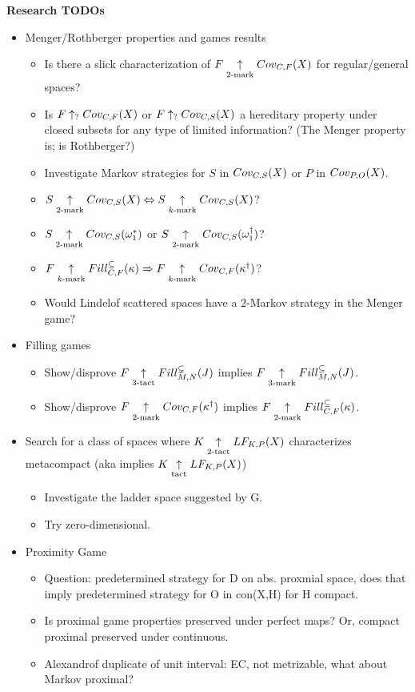 


\centerline{\bf Research TODOs}

  \begin{itemize}
    \item Menger/Rothberger properties and games results
      \begin{itemize}
        \item Is there a slick characterization of $F\underset{2\text{-mark}}{\uparrow}Cov_{C,F}(X)$ for regular/general spaces?
        \item Is $F\uparrow_{?}Cov_{C,F}(X)$ or $F\uparrow_{?}Cov_{C,S}(X)$ a hereditary property under closed subsets for any type of limited information? (The Menger property is; is Rothberger?)
        \item Investigate Markov strategies for $S$ in $Cov_{C,S}(X)$ or $P$ in $Cov_{P,O}(X)$.
        \item $S\underset{2\text{-mark}}{\uparrow}Cov_{C,S}(X)\Leftrightarrow S\underset{k\text{-mark}}{\uparrow}Cov_{C,S}(X)$?
        \item $S\underset{2\text{-mark}}{\uparrow}Cov_{C,S}(\omega_1^*)$ or $S\underset{2\text{-mark}}{\uparrow}Cov_{C,S}(\omega_1^\dagger)$?
        \item $F\underset{k\text{-mark}}{\uparrow}Fill^{\subseteq}_{C,F}(\kappa) \Rightarrow F\underset{k\text{-mark}}{\uparrow}Cov_{C,F}(\kappa^\dagger)$?
        \item Would Lindelof scattered spaces have a $2$-Markov strategy in the Menger game?
      \end{itemize}
    \item Filling games
      \begin{itemize}
        \item Show/disprove $F\underset{3\text{-tact}}{\uparrow}Fill^{\subsetneq}_{M,N}(J)$ implies $F\underset{3\text{-mark}}{\uparrow}Fill^{\subseteq}_{M,N}(J)$.
        \item Show/disprove $F\underset{2\text{-mark}}{\uparrow}Cov_{C,F}(\kappa^\dagger)$ implies $F\underset{2\text{-mark}}{\uparrow}Fill^{\subseteq}_{C,F}(\kappa)$.
      \end{itemize}
    \item Search for a class of spaces where $K\underset{2\text{-tact}}{\uparrow}LF_{K,P}(X)$ characterizes metacompact (aka implies $K\underset{\text{tact}}{\uparrow}LF_{K,P}(X)$)
      \begin{itemize}
        \item Investigate the ladder space suggested by G.
        \item Try zero-dimensional.
      \end{itemize}
    \item Proximity Game
      \begin{itemize}
        \item Question: predetermined strategy for D on abs. proxmial space, does that imply predetermined strategy for O in con(X,H) for H compact.
        \item Is proximal game properties preserved under perfect maps? Or, compact proximal preserved under continuous.
        \item Alexandrof duplicate of unit interval: EC, not metrizable, what about Markov proximal?
      \end{itemize}
  \end{itemize}
